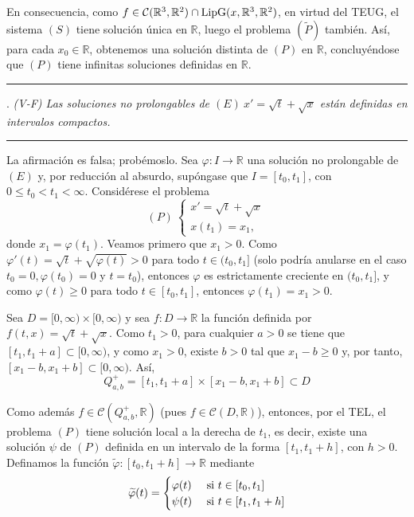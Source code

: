 \documentclass[11pt]{report}
\newcommand{\R}{\mathbb R}
\begin{document}
En consecuencia, como $f \in \mathcal{C}(\R^3,\R^2) \cap \textup{LipG}(x,\R^3,\R^2)$, en virtud del TEUG, el sistema $(S)$ tiene solución única en $\R$, luego el problema $(\widetilde{P})$ también. Así, para cada $x_0 \in \R$, obtenemos una solución distinta de $(P)$ en $\R$, concluyéndose que $(P)$ tiene infinitas soluciones definidas en $\R$.

\vspace{4mm}

\hrule

\vspace{4mm}

. \textit{(V-F) Las soluciones no prolongables de $(E) \ x'=\sqrt{t}+\sqrt{x}$ están definidas en intervalos compactos.}

\vspace{4mm}

\hrule

\vspace{4mm}

La afirmación es falsa; probémoslo. Sea $\varphi \colon I \to \R$ una solución no prolongable de $(E)$ y, por reducción al absurdo, supóngase que $I=[t_0,t_1]$, con $0 \leq t_0 < t_1 < \infty$. Considérese el problema
\[(P) \ \begin{cases}
    x'=\sqrt{t}+\sqrt{x} \\
    x(t_1)=x_1,
\end{cases}\]
donde $x_1=\varphi(t_1)$. Veamos primero que $x_1 >0$. Como $\varphi'(t)=\sqrt{t}+\sqrt{\varphi(t)} >0$ para todo $t \in (t_0,t_1]$ (solo podría anularse en el caso $t_0=0,\varphi(t_0)=0$ y $t=t_0$), entonces $\varphi$ es estrictamente creciente en $(t_0,t_1]$, y como $\varphi(t) \geq 0$ para todo $t \in [t_0,t_1]$, entonces $\varphi(t_1)=x_1>0$.

\vspace{2mm}

Sea $D =[0,\infty) \times [0,\infty)$ y sea $f \colon D \to \R$ la función definida por $f(t,x)=\sqrt{t}+\sqrt{x}$. Como $t_1 >0$, para cualquier $a>0$ se tiene que $[t_1,t_1+a] \subset [0,\infty)$, y como $x_1 >0$, existe $b >0$ tal que $x_1-b \geq 0$ y, por tanto, $[x_1-b,x_1+b] \subset [0,\infty)$. Así,
\[Q_{a,b}^+=[t_1,t_1+a] \times [x_1-b,x_1+b] \subset D\]

Como además $f \in \mathcal{C}(Q_{a,b}^+,\R)$ (pues $f \in \mathcal{C}(D,\R)$), entonces, por el TEL, el problema $(P)$ tiene solución local a la derecha de $t_1$, es decir, existe una solución $\psi$ de $(P)$ definida en un intervalo de la forma $[t_1,t_1+h]$, con $h >0$. Definamos la función $\widetilde{\varphi} \colon [t_0,t_1+h] \to \R$ mediante
\[\widetilde{\varphi}(t)=\begin{cases}
    \varphi(t) & $ si $ t \in [t_0,t_1] \\
    \psi(t) & $ si $ t \in [t_1,t_1+h]
\end{cases}\]
\end{document}

